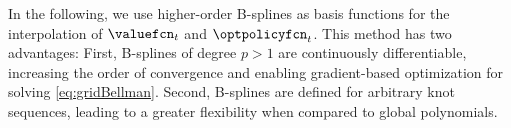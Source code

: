 \vspace*{1em}

In the following, we use higher-order B-splines as basis functions for
the interpolation of $\valuefcn_t$ and $\optpolicyfcn_t$.
This method has two advantages:
First, B-splines of degree $p > 1$ are continuously differentiable,
increasing the order of convergence and enabling
gradient-based optimization for solving \cref{eq:gridBellman}.
Second, B-splines are defined for arbitrary knot sequences,
leading to a greater flexibility when compared to global polynomials.
